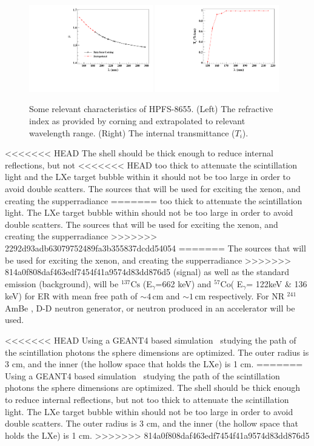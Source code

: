 \begin{figure}[h]
   \centering
   \includegraphics[width=0.48\textwidth]{RI-calibration.pdf}
    \includegraphics[width=0.48\textwidth]{IntTransmittance.pdf}
   \caption{Some relevant characteristics of HPFS-8655. (Left) The refractive index as provided by corning and 
   extrapolated to relevant wavelength range. (Right) The internal transmittance ($T_{i}$). } 
   \label{fig:hpfsRIcalibration}
\end{figure}


<<<<<<< HEAD
The shell should be thick enough to reduce internal reflections, but not 
<<<<<<< HEAD
too thick to attenuate the scintillation light and the LXe target bubble within it should not be too large in order to avoid double scatters. 
The sources that will be used for exciting the xenon, and creating the supperradiance 
=======
too thick to attenuate the scintillation light. The LXe target bubble within should not be too large in order to avoid double scatters. The sources that will be used for exciting the xenon, and creating the supperradiance 
>>>>>>> 2292d93adb63079752489fa3b355837dcdd54054
=======
The sources that will be used for exciting the xenon, and creating the supperradiance 
>>>>>>> 814a0f808daf463edf7454f41a9574d83dd876d5
(signal) as well as the standard emission (background), will be $^{137} \mathrm{Cs}$ 
(E$_\gamma$=662 keV) and $^{57} \mathrm{Co}$( E$_\gamma$= 122keV \& 136 keV) for ER with mean free path of $\sim4$\,cm and $\sim1$\,cm respectively. For NR $^{241}$AmBe , 
D-D neutron generator, or neutron produced in an accelerator will be used.

<<<<<<< HEAD
Using a GEANT4 based simulation~\cite{AGOSTINELLI2003250} studying the path of the scintillation photons the sphere dimensions are optimized. 
The outer radius  is 3 cm, and the inner (the hollow space that holds the LXe) is 1 cm. 
=======
Using a GEANT4 based simulation~\cite{AGOSTINELLI2003250} studying the path of the scintillation photons the sphere dimensions are optimized. The shell should be thick enough to reduce internal reflections, but not 
too thick to attenuate the scintillation light. The LXe target bubble within should not be too large in order to avoid double scatters. The outer radius  is 3 cm, and the inner (the hollow space that holds the LXe) is 1 cm. 
>>>>>>> 814a0f808daf463edf7454f41a9574d83dd876d5
